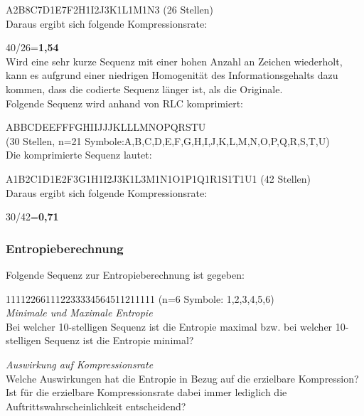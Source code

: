 \documentclass[12pt,german]{article}
\begin{document}
A2B8C7D1E7F2H1I2J3K1L1M1N3 (26 Stellen)\\

Daraus ergibt sich folgende Kompressionsrate:

40/26=\textbf{1,54}\\

Wird eine sehr kurze Sequenz mit einer hohen Anzahl an Zeichen wiederholt, kann es aufgrund einer niedrigen Homogenität des Informationsgehalts dazu kommen, dass die codierte Sequenz länger ist, als die Originale.\\


Folgende Sequenz wird anhand von RLC komprimiert:

ABBCDEEFFFGHIIJJJKLLLMNOPQRSTU\\ (30 Stellen, n=21 Symbole:A,B,C,D,E,F,G,H,I,J,K,L,M,N,O,P,Q,R,S,T,U)\\

Die komprimierte Sequenz lautet:

A1B2C1D1E2F3G1H1I2J3K1L3M1N1O1P1Q1R1S1T1U1 (42 Stellen)\\

Daraus ergibt sich folgende Kompressionsrate:

30/42=\textbf{0,71}\\

\subsubsection{Entropieberechnung}
Folgende Sequenz zur Entropieberechnung ist gegeben:

111122661112233334564511211111 (n=6 Symbole: 1,2,3,4,5,6)\\

\textit{Minimale und Maximale Entropie}\\
Bei welcher 10-stelligen Sequenz ist die Entropie maximal bzw. bei welcher 10-stelligen Sequenz ist die Entropie minimal? 

\textit{Auswirkung auf Kompressionsrate}\\
Welche Auswirkungen hat die Entropie in Bezug auf die erzielbare Kompression?
Ist für die erzielbare Kompressionsrate dabei immer lediglich die Auftrittswahrscheinlichkeit entscheidend?
\end{document}
